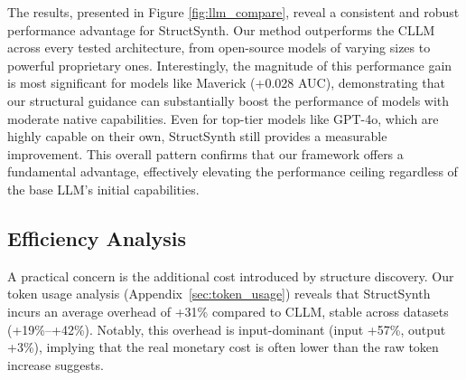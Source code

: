 The results, presented in Figure \ref{fig:llm_compare}, reveal a consistent and robust performance advantage for \textsf{StructSynth}. Our method outperforms the CLLM across every tested architecture, from open-source models of varying sizes to powerful proprietary ones. Interestingly, the magnitude of this performance gain is most significant for models like Maverick (+0.028 AUC), demonstrating that our structural guidance can substantially boost the performance of models with moderate native capabilities. Even for top-tier models like GPT-4o, which are highly capable on their own, \textsf{StructSynth} still provides a measurable improvement. This overall pattern confirms that our framework offers a fundamental advantage, effectively elevating the performance ceiling regardless of the base LLM's initial capabilities. 

\subsection{Efficiency Analysis}
A practical concern is the additional cost introduced by structure discovery. Our token usage analysis (Appendix~\ref{sec:token_usage}) reveals that \textsf{StructSynth} incurs an average overhead of +31\% compared to CLLM, stable across datasets (+19\%–+42\%). Notably, this overhead is input-dominant (input +57\%, output +3\%), implying that the real monetary cost is often lower than the raw token increase suggests.

